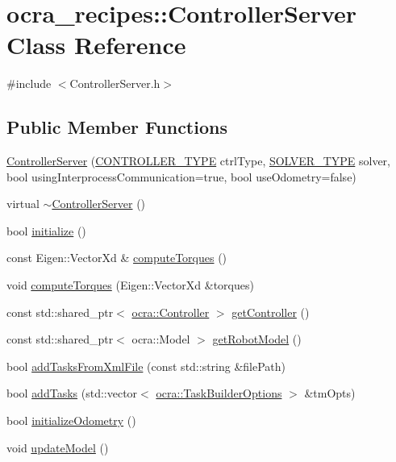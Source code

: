 \hypertarget{classocra__recipes_1_1ControllerServer}{}\section{ocra\+\_\+recipes\+:\+:Controller\+Server Class Reference}
\label{classocra__recipes_1_1ControllerServer}


{\ttfamily \#include $<$Controller\+Server.\+h$>$}

\subsection*{Public Member Functions}
\begin{DoxyCompactItemize}
\item 
\hyperlink{classocra__recipes_1_1ControllerServer_a78cc49b2b2a3f9daecc0662051b5644d}{Controller\+Server} (\hyperlink{namespaceocra__recipes_ae561cff4ea9a191b8b1ebb4e69a1a4ba}{C\+O\+N\+T\+R\+O\+L\+L\+E\+R\+\_\+\+T\+Y\+PE} ctrl\+Type, \hyperlink{namespaceocra__recipes_afb3bb4de56c2b9472c80d746eb13fed3}{S\+O\+L\+V\+E\+R\+\_\+\+T\+Y\+PE} solver, bool using\+Interprocess\+Communication=true, bool use\+Odometry=false)
\item 
virtual \hyperlink{classocra__recipes_1_1ControllerServer_a02157f0e6432dae6d8ebf3126c335444}{$\sim$\+Controller\+Server} ()
\item 
bool \hyperlink{classocra__recipes_1_1ControllerServer_af51ea42acb8c1adc3db4cc2a256f1f46}{initialize} ()
\item 
const Eigen\+::\+Vector\+Xd \& \hyperlink{classocra__recipes_1_1ControllerServer_a4b4c825748bc85f200f4b82cbffb8e0d}{compute\+Torques} ()
\item 
void \hyperlink{classocra__recipes_1_1ControllerServer_a925d4de1de73f0ac18e50f0f3c4cd0a4}{compute\+Torques} (Eigen\+::\+Vector\+Xd \&torques)
\item 
const std\+::shared\+\_\+ptr$<$ \hyperlink{classocra_1_1Controller}{ocra\+::\+Controller} $>$ \hyperlink{classocra__recipes_1_1ControllerServer_a40bc86b6d9a4140441320c88bfc77652}{get\+Controller} ()
\item 
const std\+::shared\+\_\+ptr$<$ ocra\+::\+Model $>$ \hyperlink{classocra__recipes_1_1ControllerServer_ab83e5cc59e33d26cedbea43afae25e1e}{get\+Robot\+Model} ()
\item 
bool \hyperlink{classocra__recipes_1_1ControllerServer_ad2ca7fafa8c7fff009581df869f65d85}{add\+Tasks\+From\+Xml\+File} (const std\+::string \&file\+Path)
\item 
bool \hyperlink{classocra__recipes_1_1ControllerServer_ad78efdf5d90308b0dc8e88d6d0720c5f}{add\+Tasks} (std\+::vector$<$ \hyperlink{classocra_1_1TaskBuilderOptions}{ocra\+::\+Task\+Builder\+Options} $>$ \&tm\+Opts)
\item 
bool \hyperlink{classocra__recipes_1_1ControllerServer_a441016519ed42fee35c1fd9ae458d874}{initialize\+Odometry} ()
\item 
void \hyperlink{classocra__recipes_1_1ControllerServer_a83755d02be88fa3805d770d964995fb0}{update\+Model} ()
\end{DoxyCompactItemize}
